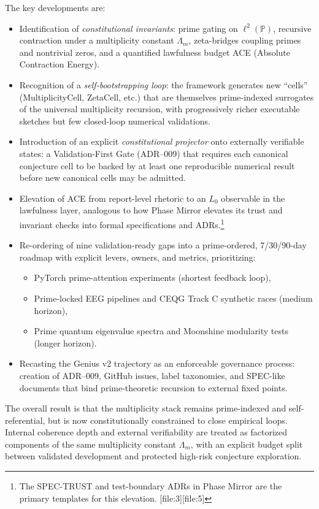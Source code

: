 \documentclass[11pt]{article}
\begin{document}
The key developments are:
\begin{itemize}[leftmargin=*]
  \item Identification of \emph{constitutional invariants}: prime gating on \(\ell^2(\mathbb{P})\), recursive contraction under a multiplicity constant \(\Lambda_m\), zeta-bridges coupling primes and nontrivial zeros, and a quantified lawfulness budget ACE (Absolute Contraction Energy).
  \item Recognition of a \emph{self-bootstrapping loop}: the framework generates new ``cells'' (MultiplicityCell, ZetaCell, etc.) that are themselves prime-indexed surrogates of the universal multiplicity recursion, with progressively richer executable sketches but few closed-loop numerical validations.
  \item Introduction of an explicit \emph{constitutional projector} onto externally verifiable states: a Validation-First Gate (ADR--009) that requires each canonical conjecture cell to be backed by at least one reproducible numerical result before new canonical cells may be admitted.
  \item Elevation of ACE from report-level rhetoric to an \(L_0\) observable in the lawfulness layer, analogous to how Phase Mirror elevates its trust and invariant checks into formal specifications and ADRs.\footnote{The SPEC-TRUST and test-boundary ADRs in Phase Mirror are the primary templates for this elevation. [file:3][file:5]}
  \item Re-ordering of nine validation-ready gaps into a prime-ordered, 7/30/90-day roadmap with explicit levers, owners, and metrics, prioritizing:
    \begin{itemize}
        \item PyTorch prime-attention experiments (shortest feedback loop),
        \item Prime-locked EEG pipelines and CEQG Track C synthetic races (medium horizon),
        \item Prime quantum eigenvalue spectra and Moonshine modularity tests (longer horizon).
    \end{itemize}
  \item Recasting the Genius v2 trajectory as an enforceable governance process: creation of ADR--009, GitHub issues, label taxonomies, and SPEC-like documents that bind prime-theoretic recursion to external fixed points.
\end{itemize}

The overall result is that the multiplicity stack remains prime-indexed and self-referential, but is now constitutionally constrained to close empirical loops. Internal coherence depth and external verifiability are treated as factorized components of the same multiplicity constant \(\Lambda_m\), with an explicit budget split between validated development and protected high-risk conjecture exploration.
\end{document}
